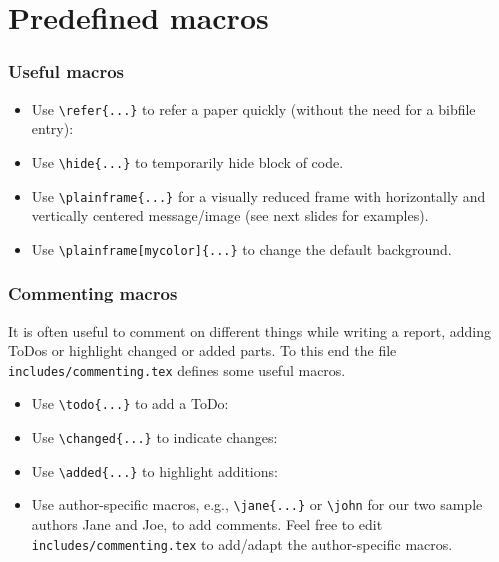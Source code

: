 \documentclass[t,english]{beamer}
\begin{document}

\section{Predefined macros}

\begin{frame}[fragile]
  \frametitle{Useful macros}

  \begin{itemize}
    \item Use \verb|\refer{...}| to refer a paper quickly (without the need for a bibfile entry): 
    \item Use \verb|\hide{...}| to temporarily hide block of code.
    \item Use \verb|\plainframe{...}| for a visually reduced frame with horizontally and vertically centered message/image (see next slides for examples).
    \item Use \verb|\plainframe[mycolor]{...}| to change the default background.
  \end{itemize}

\end{frame}

\plainframe{\textcolor{rwth-blue-100}{Plain slide (focus on certain element)}}


\begin{frame}[fragile]
  \frametitle{Commenting macros}
    
  It is often useful to comment on different things while writing a report, adding ToDos or highlight changed or added parts. To this end the file \texttt{includes/commenting.tex} defines some useful macros.
  \begin{itemize}
    \item Use \verb|\todo{...}| to add a ToDo:\newline {}
    \item Use \verb|\changed{...}| to indicate changes:\newline {}
    \item Use \verb|\added{...}| to highlight additions:\newline {}
    \item Use author-specific macros, e.g., \verb|\jane{...}| or \verb|\john| for our two sample authors Jane and Joe, to add comments. Feel free to edit \texttt{includes/commenting.tex} to add/adapt the author-specific macros.\newline{}
    \newline
  \end{itemize}
    
\end{frame}
\end{document}
